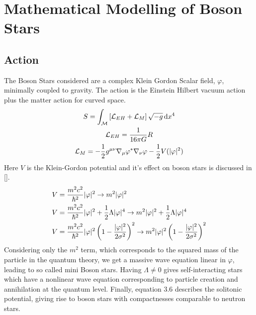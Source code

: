 





\section{Mathematical Modelling of Boson Stars}
\subsection{Action}
The Boson Stars considered are a complex Klein Gordon Scalar field, $\varphi$, minimally coupled to gravity. The action is the Einstein Hilbert vacuum action plus the matter action for curved space.
\begin{gather} S = \int_\mathcal{M}\left[\mathcal{L}_{EH} + \mathcal{L}_M\right] \sqrt{-g}\,\mathrm{d} x^4 \\
 \mathcal{L}_{EH} = \frac{1}{16\pi G}R \\
 \mathcal{L}_{M} =-\frac{1}{2}g^{\mu\nu}\nabla_\mu \varphi^* \nabla_\nu \varphi - \frac{1}{2}V(|\varphi|^2)  \end{gather}
Here $V$ is the Klein-Gordon potential and it's effect on boson stars is discussed in [].
\begin{align}
V &= \frac{m^2 c^2}{\hbar^2 }|\varphi|^2 \rightarrow m^2 |\varphi|^2\\
V &= \frac{m^2 c^2}{\hbar^2 }|\varphi|^2 + \frac{1}{2}\Lambda|\varphi|^4 \rightarrow m^2|\varphi|^2 + \frac{1}{2}\Lambda|\varphi|^4\\
V &= \frac{m^2 c^2}{\hbar^2 }|\varphi|^2\left(1-\frac{|\varphi|^2}{2\sigma^2}\right)^2 \rightarrow {m^2 }|\varphi|^2\left(1-\frac{|\varphi|^2}{2\sigma^2}\right)^2
\end{align}
Considering only the $m^2$ term, which corresponds to the squared mass of the particle in the quantum theory, we get a massive wave equation linear in $\varphi$, leading to so called mini Boson stars. Having $\Lambda\neq0$ gives self-interacting stars which have a nonlinear wave equation corresponding to particle creation and annihilation at the quantum level. Finally, equation 3.6 describes the solitonic potential, giving rise to boson stars with compactnesses comparable to neutron stars. 

